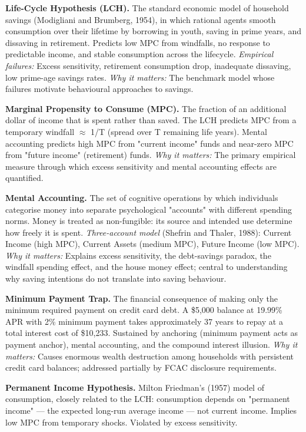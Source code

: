 \documentclass[12pt, letterpaper]{article}
\begin{document}
\textbf{Life-Cycle Hypothesis (LCH).} The standard economic model of household savings (Modigliani and Brumberg, 1954), in which rational agents smooth consumption over their lifetime by borrowing in youth, saving in prime years, and dissaving in retirement. Predicts low MPC from windfalls, no response to predictable income, and stable consumption across the lifecycle. \textit{Empirical failures:} Excess sensitivity, retirement consumption drop, inadequate dissaving, low prime-age savings rates. \textit{Why it matters:} The benchmark model whose failures motivate behavioural approaches to savings.

\textbf{Marginal Propensity to Consume (MPC).} The fraction of an additional dollar of income that is spent rather than saved. The LCH predicts MPC from a temporary windfall $\approx$ 1/T (spread over T remaining life years). Mental accounting predicts high MPC from "current income" funds and near-zero MPC from "future income" (retirement) funds. \textit{Why it matters:} The primary empirical measure through which excess sensitivity and mental accounting effects are quantified.

\textbf{Mental Accounting.} The set of cognitive operations by which individuals categorise money into separate psychological "accounts" with different spending norms. Money is treated as non-fungible: its source and intended use determine how freely it is spent. \textit{Three-account model} (Shefrin and Thaler, 1988): Current Income (high MPC), Current Assets (medium MPC), Future Income (low MPC). \textit{Why it matters:} Explains excess sensitivity, the debt-savings paradox, the windfall spending effect, and the house money effect; central to understanding why saving intentions do not translate into saving behaviour.

\textbf{Minimum Payment Trap.} The financial consequence of making only the minimum required payment on credit card debt. A \$5,000 balance at 19.99\% APR with 2\% minimum payment takes approximately 37 years to repay at a total interest cost of \$10,233. Sustained by anchoring (minimum payment acts as payment anchor), mental accounting, and the compound interest illusion. \textit{Why it matters:} Causes enormous wealth destruction among households with persistent credit card balances; addressed partially by FCAC disclosure requirements.

\textbf{Permanent Income Hypothesis.} Milton Friedman's (1957) model of consumption, closely related to the LCH: consumption depends on "permanent income" --- the expected long-run average income --- not current income. Implies low MPC from temporary shocks. Violated by excess sensitivity.
\end{document}
